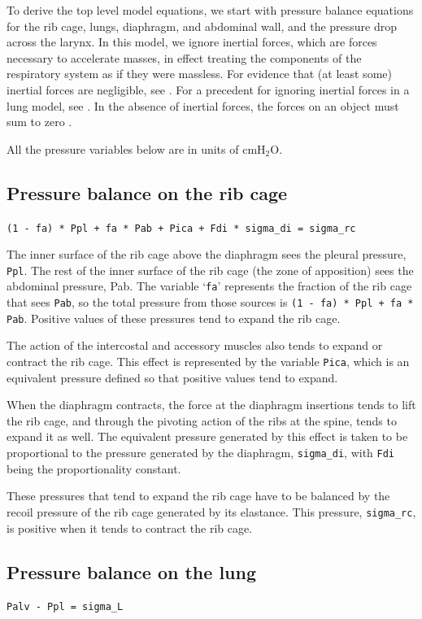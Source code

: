 \documentclass[12pt,openany,oneside]{book}
\newcommand{\ticode}[1]{\texttt{#1}}
\newcommand{\tisamp}[1]{`\texttt{#1}'}
\begin{document}
To derive the top level model equations, we start with pressure
balance equations for the rib cage, lungs, diaphragm, and abdominal
wall, and the pressure drop across the larynx. In this model, we
ignore inertial forces, which are forces necessary to accelerate
masses, in effect treating the components of the respiratory system as
if they were massless. For evidence that (at least some) inertial
forces are negligible, see \citet{Mead01091956}. For a precedent for
ignoring inertial forces in a lung model, see \citet{Younes01101981}.
In the absence of inertial forces, the forces on an object must sum to
zero \citep{Newton1687}.

All the pressure variables below are in units of cmH$_2$O.

\subsection{Pressure balance on the rib cage}
\ticode{(1 - fa) * Ppl + fa * Pab + Pica + Fdi * sigma\_di = sigma\_rc}

The inner surface of the rib cage above the diaphragm sees the pleural
pressure, \ticode{Ppl}. The rest of the inner surface of the rib cage
(the zone of apposition) sees the abdominal pressure, Pab. The
variable \tisamp{fa} represents the fraction of the rib cage that
sees \ticode{Pab}, so the total pressure from those sources is
\ticode{(1 - fa) * Ppl + fa * Pab}. Positive values of these
pressures tend to expand the rib cage.

The action of the intercostal and accessory muscles also tends to
expand or contract the rib cage. This effect is represented by the
variable \ticode{Pica}, which is an equivalent pressure defined so
that positive values tend to expand.

When the diaphragm contracts, the force at the diaphragm insertions
tends to lift the rib cage, and through the pivoting action of the
ribs at the spine, tends to expand it as well. The equivalent
pressure generated by this effect is taken to be proportional to the
pressure generated by the diaphragm, \ticode{sigma\_di}, with
\ticode{Fdi} being the proportionality constant.

These pressures that tend to expand the rib cage have to be balanced
by the recoil pressure of the rib cage generated by its elastance.
This pressure, \ticode{sigma\_rc}, is positive when it tends to
contract the rib cage.

\subsection{Pressure balance on the lung}
\ticode{Palv - Ppl = sigma\_L}
\end{document}
